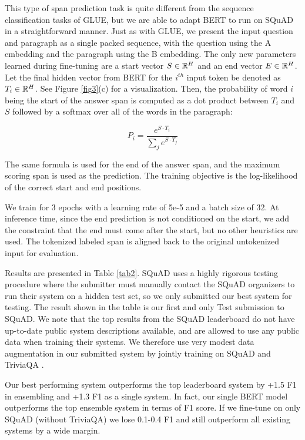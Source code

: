 	This type of span prediction task is quite different from the sequence classification tasks of GLUE, but we are able to adapt BERT to run on SQuAD in a straightforward manner. Just as with GLUE, we present the input question and paragraph as a single packed sequence, with the question using the {\selectfont A} embedding and the paragraph using the {\selectfont B} embedding. The only new parameters learned during fine-tuning are a start vector $S \in \mathbb{R}^H$ and an end vector $E \in \mathbb{R}^H$. Let the final hidden vector from BERT for the $i^{th}$ input token be denoted as $T_i \in \mathbb{R}^H$. See Figure \ref{fig3}(c) for a visualization. Then, the probability of word $i$ being the start of the answer span is computed as a dot product between $T_i$ and $S$ followed by a softmax over all of the words in the paragraph:
	
	$$P_i = \frac{e^{S \cdot T_i}}{\sum_j e^{S \cdot T_j}}$$
	
	The same formula is used for the end of the answer span, and the maximum scoring span is used as the prediction. The training objective is the log-likelihood of the correct start and end positions. 
	
	We train for 3 epochs with a learning rate of 5e-5 and a batch size of 32. At inference time, since the end prediction is not conditioned on the start, we add the constraint that the end must come after the start, but no other heuristics are used. The tokenized labeled span is aligned back to the original untokenized input for evaluation.
	
	Results are presented in Table \ref{tab2}. SQuAD uses a highly rigorous testing procedure where the submitter must manually contact the SQuAD organizers to run their system on a hidden test set, so we only submitted our best system for testing. The result shown in the table is our first and only Test submission to SQuAD. We note that the top results from the SQuAD leaderboard do not have up-to-date public system descriptions available, and are allowed to use any public data when training their systems. We therefore use very modest data augmentation in our submitted system by jointly training on SQuAD and TriviaQA \citep{Mandar2017}.
	
	Our best performing system outperforms the top leaderboard system by +1.5 F1 in ensembling and +1.3 F1 as a single system. In fact, our single BERT model outperforms the top ensemble system in terms of F1 score. If we fine-tune on only SQuAD (without TriviaQA) we lose 0.1-0.4 F1 and still outperform all existing systems by a wide margin.
	
